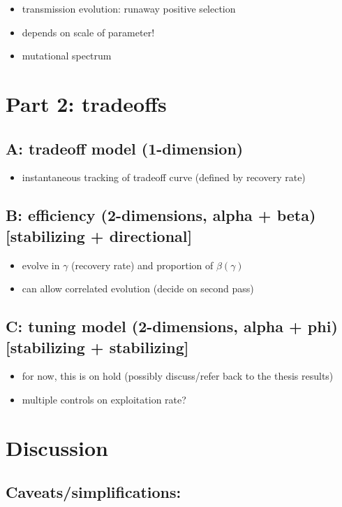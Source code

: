 \begin{itemize}
    \item transmission evolution: runaway positive selection
    \item depends on scale of parameter!
    \item mutational spectrum
\end{itemize}

\section*{Part 2: tradeoffs}

\subsection*{A: tradeoff model (1-dimension)}

\begin{itemize}
\item instantaneous tracking of tradeoff curve (defined by recovery rate)
\end{itemize}

\subsection*{B: efficiency (2-dimensions, alpha + beta) [stabilizing + directional]}
\begin{itemize}
  \item evolve in $\gamma$ (recovery rate) and proportion of $\beta(\gamma)$
  \item can allow correlated evolution (decide on second pass)
\end{itemize}

\subsection*{C: tuning model (2-dimensions, alpha + phi) [stabilizing + stabilizing]}
\begin{itemize}
  \item for now, this is on hold (possibly discuss/refer back to the thesis results)
  \item multiple controls on exploitation rate?
\end{itemize}

\section*{Discussion}

\subsection*{Caveats/simplifications:}

